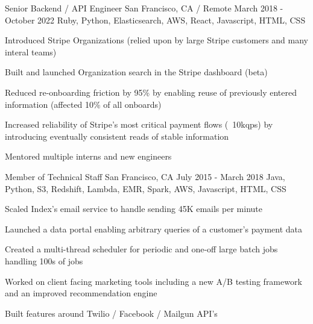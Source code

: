 \documentclass[letterpaper]{simjega-resume}
\begin{document}
{Senior Backend / API Engineer}
{San Francisco, CA / Remote}
{March 2018 - October 2022}
{Ruby, Python, Elasticsearch, AWS, React, Javascript, HTML, CSS}
{\begin{tightitemize}
\item[] Introduced Stripe Organizations (relied upon by large Stripe customers and many interal teams)
\item[] Built and launched Organization search in the Stripe dashboard (beta)
\item[] Reduced re-onboarding friction by 95\% by enabling reuse of previously entered information (affected 10\% of all onboards)
\item[] Increased reliability of Stripe's most critical payment flows (~10kqps) by introducing eventually consistent reads of stable information
\item[] Mentored multiple interns and new engineers
\end{tightitemize}}

{Member of Technical Staff}
{San Francisco, CA}
{July 2015 - March 2018}
{Java, Python, S3, Redshift, Lambda, EMR, Spark, AWS, Javascript, HTML, CSS}
{\begin{tightitemize}
\item[] Scaled Index's email service to handle sending 45K emails per minute
\item[] Launched a data portal enabling arbitrary queries of a customer's payment data
\item[] Created a multi-thread scheduler for periodic and one-off large batch jobs handling 100s of jobs
\item[] Worked on client facing marketing tools including a new A/B testing framework and an improved recommendation engine
\item[] Built features around Twilio / Facebook / Mailgun API's
\end{tightitemize}}
\end{document}
